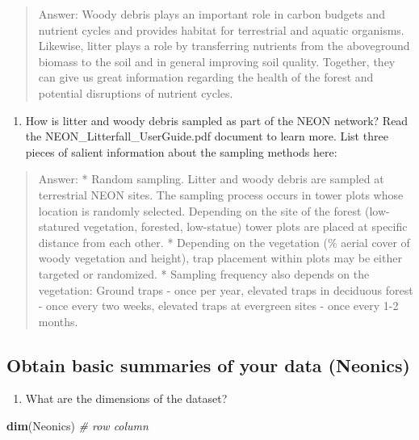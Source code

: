 \documentclass[
]{article}
\newenvironment{Shaded}{\begin{snugshade}}{\end{snugshade}}
\newcommand{\CommentTok}[1]{\textcolor[rgb]{0.56,0.35,0.01}{\textit{#1}}}
\newcommand{\KeywordTok}[1]{\textcolor[rgb]{0.13,0.29,0.53}{\textbf{#1}}}
\newcommand{\NormalTok}[1]{#1}
\providecommand{\tightlist}{%
  \setlength{\itemsep}{0pt}\setlength{\parskip}{0pt}}
\begin{document}
\begin{quote}
Answer: Woody debris plays an important role in carbon budgets and
nutrient cycles and provides habitat for terrestrial and aquatic
organisms. Likewise, litter plays a role by transferring nutrients from
the aboveground biomass to the soil and in general improving soil
quality. Together, they can give us great information regarding the
health of the forest and potential disruptions of nutrient cycles.
\end{quote}

\begin{enumerate}
\def\labelenumi{\arabic{enumi}.}
\setcounter{enumi}{3}
\tightlist
\item
  How is litter and woody debris sampled as part of the NEON network?
  Read the NEON\_Litterfall\_UserGuide.pdf document to learn more. List
  three pieces of salient information about the sampling methods here:
\end{enumerate}

\begin{quote}
Answer: * Random sampling. Litter and woody debris are sampled at
terrestrial NEON sites. The sampling process occurs in tower plots whose
location is randomly selected. Depending on the site of the forest
(low-statured vegetation, forested, low-statue) tower plots are placed
at specific distance from each other. * Depending on the vegetation (\%
aerial cover of woody vegetation and height), trap placement within
plots may be either targeted or randomized. * Sampling frequency also
depends on the vegetation: Ground traps - once per year, elevated traps
in deciduous forest - once every two weeks, elevated traps at evergreen
sites - once every 1-2 months.
\end{quote}

\hypertarget{obtain-basic-summaries-of-your-data-neonics}{%
\subsection{Obtain basic summaries of your data
(Neonics)}\label{obtain-basic-summaries-of-your-data-neonics}}

\begin{enumerate}
\def\labelenumi{\arabic{enumi}.}
\setcounter{enumi}{4}
\tightlist
\item
  What are the dimensions of the dataset?
\end{enumerate}

\begin{Shaded}
\begin{Highlighting}[]
\KeywordTok{dim}\NormalTok{(Neonics) }\CommentTok{# row column}
\end{Highlighting}
\end{Shaded}
\end{document}
